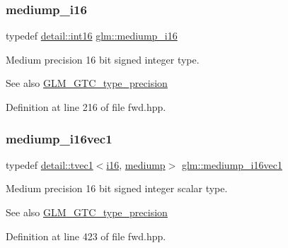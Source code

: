 \subsubsection{\texorpdfstring{mediump\+\_\+i16}{mediump\_i16}}
{\footnotesize\ttfamily typedef \hyperlink{namespaceglm_1_1detail_a375938874ca4f0a0982ec6373b56117b}{detail\+::int16} \hyperlink{group__gtc__type__precision_ga8454fc6a82c7bb787d0ac9663e08f63d}{glm\+::mediump\+\_\+i16}}

Medium precision 16 bit signed integer type. \begin{DoxySeeAlso}{See also}
\hyperlink{group__gtc__type__precision}{G\+L\+M\+\_\+\+G\+T\+C\+\_\+type\+\_\+precision} 
\end{DoxySeeAlso}


Definition at line 216 of file fwd.\+hpp.

\mbox{\label{group__gtc__type__precision_ga6a1d37139ea8990de24edf4bfa3500ad}} 
\subsubsection{\texorpdfstring{mediump\+\_\+i16vec1}{mediump\_i16vec1}}
{\footnotesize\ttfamily typedef \hyperlink{structglm_1_1detail_1_1tvec1}{detail\+::tvec1}$<$\hyperlink{group__gtc__type__precision_ga35e5542ca05b29cc256fdafb8503d1fd}{i16}, \hyperlink{namespaceglm_a0f04f086094c747d227af4425893f545a6416f3ea0c9025fb21ed50c4d6620482}{mediump}$>$ \hyperlink{group__gtc__type__precision_ga6a1d37139ea8990de24edf4bfa3500ad}{glm\+::mediump\+\_\+i16vec1}}

Medium precision 16 bit signed integer scalar type. \begin{DoxySeeAlso}{See also}
\hyperlink{group__gtc__type__precision}{G\+L\+M\+\_\+\+G\+T\+C\+\_\+type\+\_\+precision} 
\end{DoxySeeAlso}


Definition at line 423 of file fwd.\+hpp.

\mbox{\label{group__gtc__type__precision_ga664a0266910df3c2d6559651f94d32e6}} 
